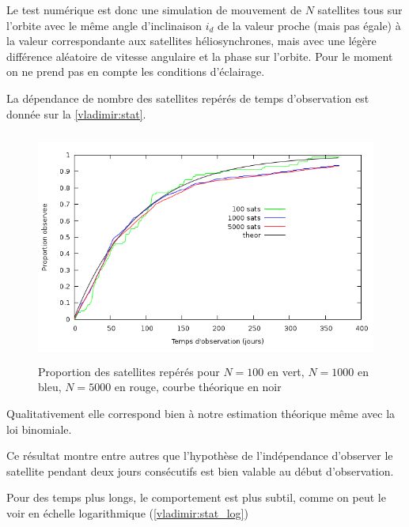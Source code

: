 Le test num\'erique est donc une simulation de mouvement de $N$ satellites
tous sur l'orbite avec le m\^eme angle d'inclinaison $i_d$ de la valeur proche (mais pas \'egale) 
\`a la valeur correspondante aux satellites h\'eliosynchrones, mais avec une l\'eg\`ere diff\'erence 
al\'eatoire de vitesse angulaire et la phase sur l'orbite. Pour le moment on 
ne prend pas en compte les conditions d'\'eclairage. 

La d\'ependance de nombre des satellites rep\'er\'es de temps d'observation
est donn\'ee sur la \autoref{vladimir:stat}. 
 \begin{figure}[htp] \centering
      \includegraphics*[height=3in]{stat.png}
      \caption{
            \label{vladimir:stat}
  Proportion des satellites rep\'er\'es pour  $N = 100$ en vert, $N = 1000$ en bleu, $N = 5000$ en rouge, courbe th\'eorique
  en noir}
 \end{figure}
Qualitativement elle correspond bien \`a notre estimation th\'eorique m\^eme avec la loi
binomiale.  

Ce r\'esultat montre entre autres que l'hypoth\`ese de l'ind\'ependance 
d'observer le satellite pendant deux jours cons\'ecutifs est 
bien valable au d\'ebut d'observation. 

Pour des temps plus longs, le comportement est plus subtil, comme on
peut le voir en échelle logarithmique (\autoref{vladimir:stat_log})

